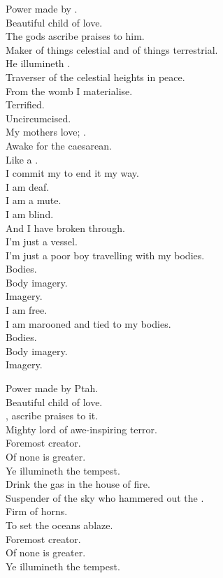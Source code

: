Power made by . \\
Beautiful child of love. \\
The gods ascribe praises to him. \\
Maker of things celestial and of things terrestrial. \\
He illumineth . \\
Traverser of the celestial heights in peace. \\

From the womb I materialise. \\
Terrified. \\
Uncircumcised. \\
My mothers love; . \\
Awake for the caesarean. \\
Like a . \\
I commit my  to end it my way. \\
I am deaf. \\
I am a mute. \\
I am blind. \\
And I have broken through. \\

I'm just a vessel. \\
I'm just a poor boy travelling with my bodies. \\
Bodies. \\
Body imagery. \\
Imagery. \\
I am free. \\
I am marooned and tied to my bodies. \\
Bodies. \\
Body imagery. \\
Imagery. \\


Power made by Ptah. \\
Beautiful child of love. \\
, ascribe praises to it. \\
Mighty lord of awe-inspiring terror. \\
Foremost creator. \\
Of none is greater. \\
Ye illumineth the tempest. \\

Drink the gas in the house of fire. \\
Suspender of the sky who hammered out the . \\
Firm of horns. \\
To set the oceans ablaze. \\
Foremost creator. \\
Of none is greater. \\
Ye illumineth the tempest. \\

